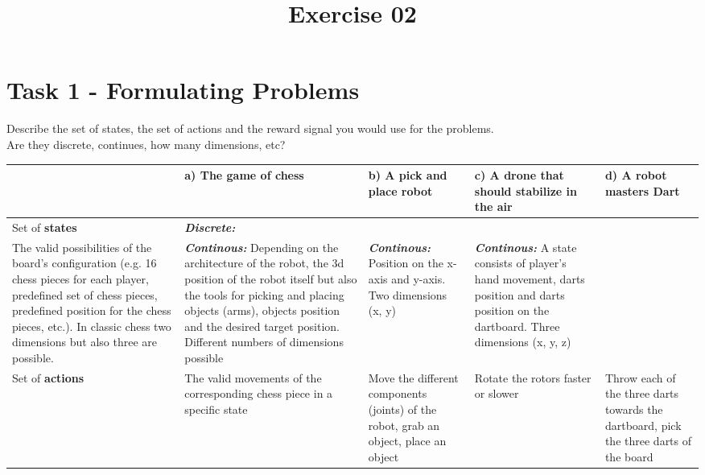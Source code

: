 \documentclass[a4paper]{article}
\date{}
\author{}
\title{\textbf{Exercise 02}}
\begin{document}
	\maketitle 
	\thispagestyle{fancy}
	
    \section*{Task 1 - Formulating Problems}
    Describe the set of states, the set of actions and the reward signal you would use for the problems.\\
    Are they discrete, continues, how many dimensions, etc?
    \newline
    \newline
    \begin{tabularx}{\textwidth} { 
    		 >{\centering}X 
    		| >{\raggedright}X 
    		| >{\raggedright\arraybackslash}X
    		| >{\raggedright\arraybackslash}X 
    		| >{\raggedright\arraybackslash}X}
    	\hline
    	 & \vspace{2pt} a) The game of chess & \vspace{2pt} b) A pick and place robot & \vspace{2pt} c) A drone that should stabilize in the air & \vspace{2pt} d) A robot masters Dart \\
    	\hline
    	\vspace{2pt} Set of \textbf{states}   & \vspace{2pt} \textbf{\textit{Discrete:}} \\ The valid possibilities of the board's configuration (e.g. 16 chess pieces for each player, predefined set of chess pieces, predefined position for the chess pieces, etc.). In classic chess two dimensions but also three are possible.   & \vspace{2pt} \textbf{\textit{Continous:}} Depending on the architecture of the robot, the 3d position of the robot itself but also the tools for picking and placing objects (arms), objects position and the desired target position. Different numbers of dimensions possible  & \vspace{2pt} \textbf{\textit{Continous:}} Position on the x-axis and y-axis. Two dimensions (x, y)    & \vspace{2pt} \textbf{\textit{Continous:}} A state consists of player's hand movement, darts position and darts position on the dartboard. Three dimensions (x, y, z)  \\
    	\hline
		\vspace{2pt} Set of \textbf{actions}  & \vspace{2pt} The valid movements of the corresponding chess  piece in a specific state  & \vspace{2pt} Move the different components (joints) of the robot, grab an object, place an object & \vspace{2pt} Rotate the rotors faster or slower & \vspace{2pt} Throw each of the three darts towards the dartboard, pick the three darts of the board   \\

\end{tabularx}
\end{document}

